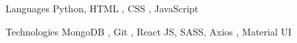 
\begin{cvskills}
  \cvskill
    {Languages} %
    {Python, HTML , CSS , JavaScript} %

  \cvskill
    {Technologies} %
    {MongoDB , Git , React JS, SASS, Axios , Material UI  } %
\end{cvskills}
